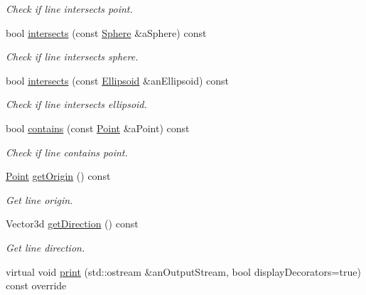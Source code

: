 \begin{DoxyCompactItemize}
\begin{DoxyCompactList}\small\item\em Check if line intersects point. \end{DoxyCompactList}\item 
bool \hyperlink{classlibrary_1_1math_1_1geom_1_1d3_1_1objects_1_1_line_ab9b35d1e6276d927e9a54219855295ce}{intersects} (const \hyperlink{classlibrary_1_1math_1_1geom_1_1d3_1_1objects_1_1_sphere}{Sphere} \&a\+Sphere) const
\begin{DoxyCompactList}\small\item\em Check if line intersects sphere. \end{DoxyCompactList}\item 
bool \hyperlink{classlibrary_1_1math_1_1geom_1_1d3_1_1objects_1_1_line_a2cc1edf1b60745c518fbf19f2ab0771c}{intersects} (const \hyperlink{classlibrary_1_1math_1_1geom_1_1d3_1_1objects_1_1_ellipsoid}{Ellipsoid} \&an\+Ellipsoid) const
\begin{DoxyCompactList}\small\item\em Check if line intersects ellipsoid. \end{DoxyCompactList}\item 
bool \hyperlink{classlibrary_1_1math_1_1geom_1_1d3_1_1objects_1_1_line_a59b72a3a39134963f5165a03829b17aa}{contains} (const \hyperlink{classlibrary_1_1math_1_1geom_1_1d3_1_1objects_1_1_point}{Point} \&a\+Point) const
\begin{DoxyCompactList}\small\item\em Check if line contains point. \end{DoxyCompactList}\item 
\hyperlink{classlibrary_1_1math_1_1geom_1_1d3_1_1objects_1_1_point}{Point} \hyperlink{classlibrary_1_1math_1_1geom_1_1d3_1_1objects_1_1_line_ad65178573d705ad21bdd54e7f4b7f104}{get\+Origin} () const
\begin{DoxyCompactList}\small\item\em Get line origin. \end{DoxyCompactList}\item 
Vector3d \hyperlink{classlibrary_1_1math_1_1geom_1_1d3_1_1objects_1_1_line_aa108a53227e4326188fe17a03c55f9cb}{get\+Direction} () const
\begin{DoxyCompactList}\small\item\em Get line direction. \end{DoxyCompactList}\item 
virtual void \hyperlink{classlibrary_1_1math_1_1geom_1_1d3_1_1objects_1_1_line_a6c2d2268fed2b9c461730fbcd4425d6e}{print} (std\+::ostream \&an\+Output\+Stream, bool display\+Decorators=true) const override

\end{DoxyCompactItemize}
